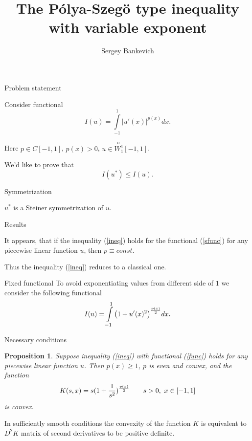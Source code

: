 \documentclass{beamer}\usepackage[]{graphicx}\usepackage[]{color}
\title{The P\'olya-Szeg\"o type inequality with variable exponent}
\author{Sergey Bankevich}
\institute{Saint Petersburg State University, Russia}
\renewcommand{\ge}{\geqslant}
\renewcommand{\le}{\leqslant}
\newcommand{\Wf}{\stackrel{o\ }{W{}_1^1}}
\newtheorem{prop}{Proposition}
\begin{document}
\begin{frame}
  \titlepage
\end{frame}


\begin{frame}{Problem statement}

Consider functional
{\Large 
\begin{equation}
I(u) = \int\limits_{-1}^1 |u'(x)|^{p(x)} dx.
\label{sfunc}
\end{equation}
}

Here $p \in C[-1, 1]$, $p(x) > 0$, $u \in \Wf[-1, 1]$.

\pause

\bigskip
We'd like to prove that
{\Large 
\begin{equation}
I(u^*) \le I(u).
\label{ineq}
\end{equation}
}

\end{frame}


\begin{frame}{Symmetrization}

$u^*$ is a Steiner symmetrization of $u$.

\end{frame}


\begin{frame}{Results}

It appears, that if the inequality (\ref{ineq}) holds for the functional (\ref{sfunc}) for any piecewise linear function $u$,
then $p \equiv const$.

Thus the inequality (\ref{ineq}) reduces to a classical one.

\end{frame}

\begin{frame}{Fixed functional}
To avoid exponentiating values from different side of $1$ we consider the following functional
{\Large
\begin{equation}
I(u) = \int\limits_{-1}^1 \big(1 + u'(x)^2 \big)^{p(x) \over 2} dx.
\label{func}
\end{equation}
}

\end{frame}

\begin{frame}{Necessary conditions}

\begin{prop}
Suppose inequality (\ref{ineq}) with functional (\ref{func}) holds for any piecewise linear function $u$.
Then $p(x) \ge 1$, $p$ is even and convex,
and the function
$$K(s, x) = s ( 1 + { 1 \over s^2 } )^{p(x) \over 2} \qquad s > 0,\ x \in [-1, 1]$$
is convex.
\end{prop}

In sufficiently smooth conditions the convexity of the function $K$ is equivalent to 
$D^2 K$ matrix of second derivatives to be positive definite.

\end{frame}
\end{document}
